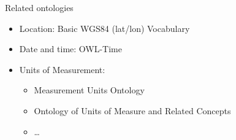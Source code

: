 \documentclass{beamer}
\begin{document}

\begin{frame}{Related ontologies}
	\begin{itemize}
		\item Location: Basic WGS84 (lat/lon) Vocabulary
		\item Date and time: OWL-Time
		\item Units of Measurement:
			\begin{itemize}
				\item Measurement Units Ontology
				\item Ontology of Units of Measure and Related Concepts
				\item …
			\end{itemize}
	\end{itemize}
\end{frame}
\end{document}
